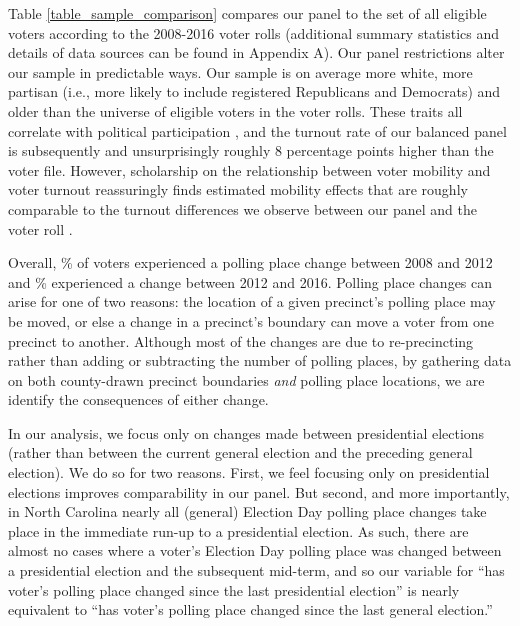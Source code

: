 \documentclass{cup_PSRM}
\begin{document}
Table \ref{table_sample_comparison} compares our panel to the set of all eligible voters according to the 2008-2016 voter rolls (additional summary statistics and details of data sources can be found in Appendix A).  Our panel restrictions alter our sample in predictable ways.  Our sample is on average more white, more partisan (i.e., more likely to include registered Republicans and Democrats) and older than the universe of eligible voters in the voter rolls.  These traits all correlate with political participation \citep{leighley2013votes}, and the turnout rate of our balanced panel is subsequently and unsurprisingly roughly 8 percentage points higher than the voter file.  However, scholarship on the relationship between voter mobility and voter turnout reassuringly finds estimated mobility effects that are roughly comparable to the turnout differences we observe between our panel and the voter roll \citep{squire1987residential,highton2000residential}.

Overall, \unskip\% of voters experienced a polling place change between 2008 and 2012 and  \unskip\% experienced a change between 2012 and 2016. Polling place changes can arise for one of two reasons: the location of a given precinct's polling place may be moved, or else a change in a precinct's boundary can move a voter from one precinct to another.  Although most of the changes are due to re-precincting rather than adding or subtracting the number of polling places, by gathering data on both county-drawn precinct boundaries \emph{and} polling place locations, we are identify the consequences of either change.

In our analysis, we focus only on changes made between presidential elections (rather than between the current general election and the preceding general election). We do so for two reasons. First, we feel focusing only on presidential elections improves comparability in our panel. But second, and more importantly, in North Carolina nearly all (general) Election Day polling place changes take place in the immediate run-up to a presidential election. As such, there are almost no cases where a voter's Election Day polling place was changed between a presidential election and the subsequent mid-term, and so our variable for ``has voter's polling place changed since the last presidential election'' is nearly equivalent to ``has voter's polling place changed since the last general election.''
\end{document}
